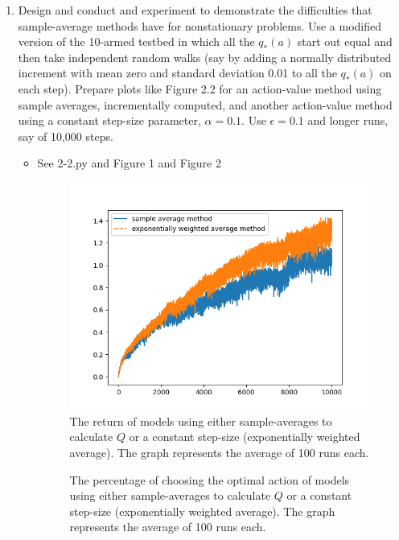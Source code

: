 \documentclass{article}
\begin{document}
\begin{enumerate}
    \item Design and conduct and experiment to demonstrate the difficulties that sample-average methods have for nonstationary problems. Use a modified version of the 10-armed testbed in which all the $q_*(a)$ start out equal and then take independent random walks (say by adding a normally distributed increment with mean zero and standard deviation 0.01 to all the $q_*(a)$ on each step). Prepare plots like Figure 2.2 for an action-value method using sample averages, incrementally computed, and another action-value method using a constant step-size parameter, $\alpha=0.1$. Use $\epsilon=0.1$ and longer runs, say of 10,000 steps.
    \begin{itemize}
        \item See 2-2.py and Figure 1 and Figure 2 
        \begin{figure}[h]
            \caption{The return of models using either sample-averages to calculate $Q$ or a constant step-size (exponentially weighted average). The graph represents the average of 100 runs each.}
            \centering
            \includegraphics[scale=0.75]{figure-1.png}
        \end{figure}
        \begin{figure}[h]
            \caption{The percentage of choosing the optimal action of models using either sample-averages to calculate $Q$ or a constant step-size (exponentially weighted average). The graph represents the average of 100 runs each.}
            \centering

\end{figure}
\end{itemize}
\end{enumerate}
\end{document}
